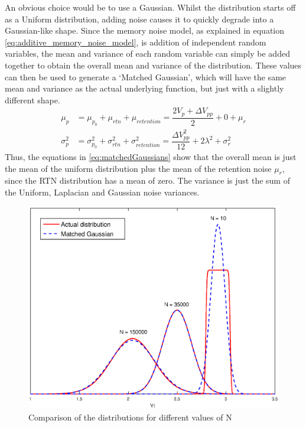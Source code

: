 \documentclass[11pt]{article}
\numberwithin{equation}{subsection}
\begin{document}
An obvious choice would be to use a Gaussian. Whilst the distribution starts off as a Uniform distribution, adding noise causes it to quickly degrade into a Gaussian-like shape. Since the memory noise model, as explained in equation \ref{eq:additive_memory_noise_model}, is addition of independent random variables, the mean and variance of each random variable can simply be added together to obtain the overall mean and variance of the distribution. These values can then be used to generate a `Matched Gaussian', which will have the same mean and variance as the actual underlying function, but just with a slightly different shape. 
\begin{equation} \label{eq:matchedGaussians}
\begin{aligned}
\mu_p &= \mu_{p_0} + \mu_{rtn} + \mu_{retention} = \dfrac{2 V_p + \Delta V_{pp}}{2} + 0 +\mu_r \\
\sigma_p^2 &= \sigma^2_{p_0} + \sigma^2_{rtn} + \sigma^2_{retention} = \dfrac{\Delta V_{pp}^2}{12} + 2\lambda^2 + \sigma^2_{r}
\end{aligned}
\end{equation}
Thus, the equations in \ref{eq:matchedGaussians} show that the overall mean is just the mean of the uniform distribution plus the mean of the retention noise $\mu_r$, since the RTN distribution has a mean of zero. The variance is just the sum of the Uniform, Laplacian and Gaussian noise variances.
\begin{figure}[ht]
\centering
\includegraphics[scale=0.7]{matched_gaussian}
\caption{Comparison of the distributions for different values of N}
\label{fig:MMGaussianVsFull}
\end{figure}
\end{document}
